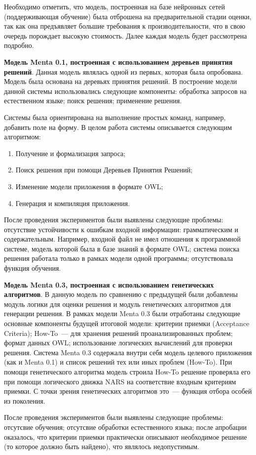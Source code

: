 Необходимо отметить, что модель, построенная на базе нейронных сетей (поддерживающая обучение) была отброшена на предварительной стадии оценки, так как она предъявляет большие требования к производительности, что в свою очередь порождает высокую стоимость. Далее каждая модель будет рассмотрена подробно.

\textbf{Модель Menta 0.1, построенная с использованием деревьев принятия решений}.
Данная модель являлась одной из первых, которая была опробована. Модель была основана на деревьях принятия решений. В построение модели данной системы использовались следующие компоненты: обработка запросов на естественном языке; поиск решения; применение решения. \par
Системы была ориентирована на выполнение простых команд, например, добавить поле на форму. В целом работа системы описывается следующим алгоритмом:
\begin{enumerate}
	\item Получение и формализация запроса;
	\item Поиск решения при помощи Деревьев Принятия Решений;
	\item Изменение модели приложения в формате OWL;
	\item Генерация и компиляция приложения.
\end{enumerate} \par
После проведения экспериментов были выявлены следующие проблемы: отсутствие устойчивости к ошибкам входной информации: грамматическим и содержательным. Например, входной файл не имел отношения к программной системе, модель которой была в базе знаний в формате OWL; система поиска решения работала только в рамках модели одной программы;  отсутствовала функция обучения. \par



\textbf{Модель Menta 0.3, построенная с использованием генетических алгоритмов}.
В данную модель по сравнению с предыдущей были добавлены модуль логики для оценки решения и модуль генетических алгоритмов для генерации решения. В рамках модели Menta 0.3 были отработаны следующие основные компоненты будущей итоговой модели: критерии приемки (Acceptance Criteria); How-To~--- для хранения решений проанализированных проблем; формат данных OWL; использование логических вычислений для проверки решения. Система Menta 0.3 содержала внутри себя модель целевого приложения (как и Menta 0.1) и список решений тех или иных проблем (How-To). При помощи генетического алгоритма модель строила How-To решение проверяла его при помощи логического движка NARS на соответствие входным критериям приемки. С точки зрения генетических алгоритмов это~--- функция отбора особей из поколения.  \par
После проведения экспериментов были выявлены следующие проблемы: отсутсвие обучения; отсутсвие обработки естественного языка; после апробации оказалось, что критерии приемки практически описывают необходимое решение (то которое должно быть найдено), что являлось недопустимым. \par


